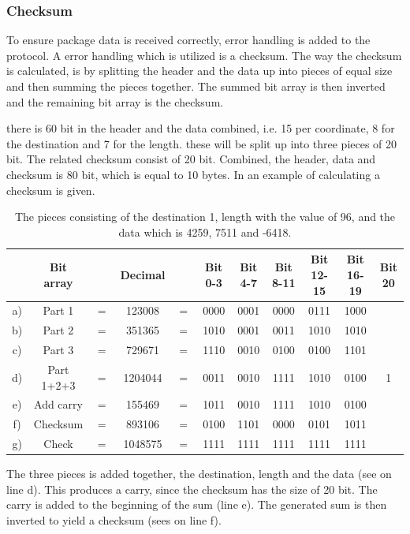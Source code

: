 \subsubsection{Checksum}
To ensure package data is received correctly, error handling is added to the protocol. A error handling which is utilized is a checksum. The way the checksum is calculated, is by splitting the header and the data up into pieces of equal size and then summing the pieces together. The summed bit array is then inverted and the remaining bit array is the checksum. 

there is 60 bit in the header and the data combined, i.e. 15 per coordinate, 8 for the destination and 7 for the length. these will be split up into three pieces of 20 bit. The related checksum consist of 20 bit. Combined, the header, data and checksum is 80 bit, which is equal to 10 bytes. In  an example of calculating a checksum is given.

\begin{table}[H]
\centering
\begin{tabular}{c c c c c c c c c c c}
   & Bit array  &     & Decimal &     & Bit 0-3 & Bit 4-7 & Bit 8-11 & Bit 12-15 & Bit 16-19 & Bit 20 \\
\hline
a) & Part 1     & $=$ & 123008  & $=$ & 0000 & 0001 & 0000 & 0111 & 1000 & \\
b) & Part 2     & $=$ & 351365  & $=$ & 1010 & 0001 & 0011 & 1010 & 1010 & \\
c) & Part 3     & $=$ & 729671  & $=$ & 1110 & 0010 & 0100 & 0100 & 1101 & \\
d) & Part 1+2+3 & $=$ & 1204044 & $=$ & 0011 & 0010 & 1111 & 1010 & 0100 & 1 \\
e) & Add carry  & $=$ & 155469  & $=$ & 1011 & 0010 & 1111 & 1010 & 0100 & \\
f) & Checksum   & $=$ & 893106  & $=$ & 0100 & 1101 & 0000 & 0101 & 1011 & \\
g) & Check      & $=$ & 1048575 & $=$ & 1111 & 1111 & 1111 & 1111 & 1111 & \\
\end{tabular}
\caption{The pieces consisting of the destination 1, length with the value of 96, and the data which is 4259, 7511 and -6418.}
\label{ChecksumExp}
\end{table}

The three pieces is added together, the destination, length and the data (see on line d). This produces a carry, since the checksum has the size of 20 bit. The carry is added to the beginning of the sum (line e). The generated sum is then inverted to yield a checksum (sees on line f).

